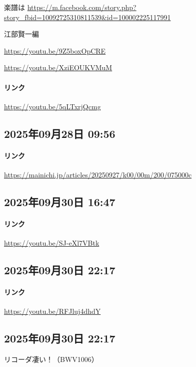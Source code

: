 楽譜は \url{https://m.facebook.com/story.php?story_fbid=10092725310811539&id=100002225117991}

江部賢一編

\url{https://youtu.be/9Z5boxOpCRE}

\url{https://youtu.be/XziEOUKVMuM}

\paragraph{リンク}
\url{https://youtu.be/5qLTxrjQcmg}

\subsection*{2025年09月28日 09:56}

\paragraph{リンク}
\url{https://mainichi.jp/articles/20250927/k00/00m/200/075000c}

\subsection*{2025年09月30日 16:47}

\paragraph{リンク}
\url{https://youtu.be/SJ-eXl7VBtk}

\subsection*{2025年09月30日 22:17}

\paragraph{リンク}
\url{https://youtu.be/RFJluj4dhdY}

\subsection*{2025年09月30日 22:17}

リコーダ凄い！（BWV1006）

